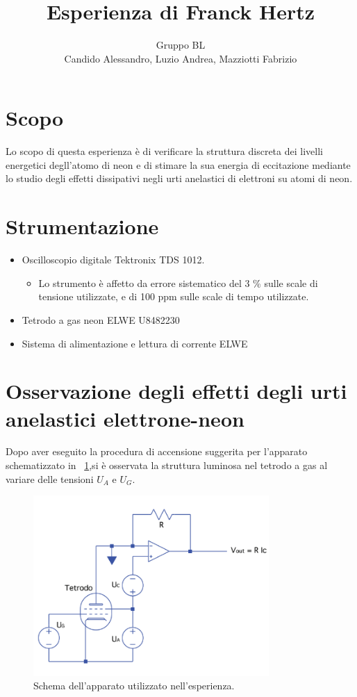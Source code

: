 \documentclass[10pt,a4paper]{article}
\title{Esperienza di Franck Hertz}
\author{Gruppo BL \\ Candido Alessandro, Luzio Andrea, Mazziotti Fabrizio}
\begin{document}
\maketitle

\section{Scopo}
Lo scopo di questa esperienza è di verificare la struttura discreta dei livelli energetici degll'atomo di neon e di stimare la sua energia di eccitazione mediante lo studio degli effetti dissipativi negli urti anelastici di elettroni su atomi di neon.

\section{Strumentazione }

\begin{itemize}
 \item Oscilloscopio digitale Tektronix TDS 1012.
 	\begin{itemize}
 		\item Lo strumento è affetto da errore sistematico del 3 \% sulle scale di tensione utilizzate, e di 100 ppm sulle scale di tempo utilizzate.
 	\end{itemize}
 \item Tetrodo a gas neon ELWE U8482230
 \item Sistema di alimentazione e lettura di corrente ELWE

\end{itemize}

\section{Osservazione degli effetti degli urti anelastici elettrone-neon}

Dopo aver eseguito la procedura di accensione suggerita per l'apparato schematizzato in \figurename{~\ref{fig:circuito}},si è osservata la struttura luminosa nel tetrodo a gas al variare delle tensioni $U_{A}$ e $U_{G}$.

\begin{figure}[h!]
	\centering
	\includegraphics[width=0.80\textwidth]{../grafici/schema_apparato.png}
	\caption{Schema dell'apparato utilizzato nell'esperienza.}
	\label{fig:circuito}
\end{figure}
\end{document}
